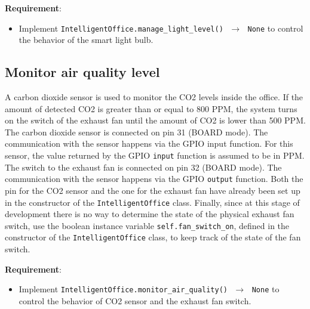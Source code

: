 \noindent\textbf{Requirement}:
\begin{itemize}
    \item Implement \texttt{IntelligentOffice.manage\_light\_level() $\,\to\,$ None} to control the behavior of the smart light bulb.
\end{itemize}


\subsection{Monitor air quality level}
A carbon dioxide sensor is used to monitor the CO2 levels inside the office. If the amount of detected CO2 is greater than or equal to 800 PPM, the system turns on the switch of the exhaust fan until the amount of CO2 is lower than 500 PPM.
The carbon dioxide sensor is connected on pin 31 (BOARD mode). The communication with the sensor happens via the GPIO input function. For this sensor, the value returned by the GPIO \texttt{input} function is assumed to be in PPM. 
The switch to the exhaust fan is connected on pin 32 (BOARD mode). The communication with the sensor happens via the GPIO \texttt{output} function.
Both the pin for the CO2 sensor and the one for the exhaust fan have already been set up in the constructor of the \texttt{IntelligentOffice} class. 
Finally, since at this stage of development there is no way to determine the state of the physical exhaust fan switch, use the boolean instance variable \texttt{self.fan\_switch\_on}, defined in the constructor of the \texttt{IntelligentOffice} class, to keep track of the state of the fan switch.

\noindent\textbf{Requirement}:
\begin{itemize}
    \item Implement \texttt{IntelligentOffice.monitor\_air\_quality() $\,\to\,$ None} to control the behavior of CO2 sensor and the exhaust fan switch.
\end{itemize}
